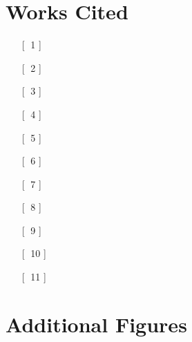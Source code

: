 \documentclass[12pt]{article} %
\begin{document}
\section{Works Cited}
\begin{itemize}
\item [[$\;$ 1]] 
\item [[$\;$ 2]] 
\item [[$\;$ 3]] 
\item [[$\;$ 4]] 
\item [[$\;$ 5]] 
\item [[$\;$ 6]] 
\item [[$\;$ 7]]  
\item [[$\;$ 8]] 
\item [[$\;$ 9]] 
\item [[$\;$ 10]] 
\item [[$\;$ 11]] 
\end{itemize}
\newpage
\appendix
\appendixpage
\section{Additional Figures} \label{sec:add}
\end{document}
